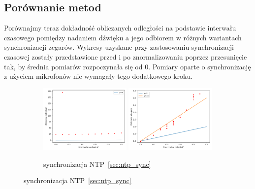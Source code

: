 \subsection{Porównanie metod}

Porównajmy teraz dokładność obliczanych odległości na podstawie interwału czasowego pomiędzy nadaniem dźwięku a jego odbiorem w różnych wariantach synchronizacji zegarów. Wykresy uzyskane przy zastosowaniu synchronizacji czasowej zostały przedstawione przed i po znormalizowaniu poprzez przesunięcie tak, by średnia pomiarów rozpoczynała się od 0. Pomiary oparte o synchronizację z użyciem mikrofonów nie wymagały tego dodatkowego kroku.

\begin{figure}[H]
    \centering
    \begin{subfigure}{\textwidth}
        \centering
        \includegraphics[width=0.49\textwidth]{pics/ntp_sync_dist/dists.png}
        \includegraphics[width=0.49\textwidth]{pics/ntp_sync_dist/dists_close.png}
        \caption{synchronizacja NTP~\ref{sec:ntp_sync}}
        \label{pic:ntp_sync_dist}
    \end{subfigure}
\end{figure}
